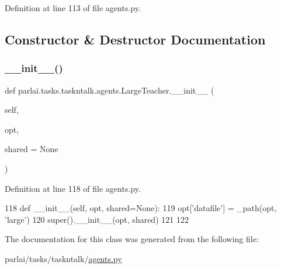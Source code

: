 Definition at line 113 of file agents.\+py.



\subsection{Constructor \& Destructor Documentation}
\mbox{\label{classparlai_1_1tasks_1_1taskntalk_1_1agents_1_1LargeTeacher_af178f2514d254ac1ae9b0d956041d13c}} 
\subsubsection{\texorpdfstring{\+\_\+\+\_\+init\+\_\+\+\_\+()}{\_\_init\_\_()}}
{\footnotesize\ttfamily def parlai.\+tasks.\+taskntalk.\+agents.\+Large\+Teacher.\+\_\+\+\_\+init\+\_\+\+\_\+ (\begin{DoxyParamCaption}\item[{}]{self,  }\item[{}]{opt,  }\item[{}]{shared = {\ttfamily None} }\end{DoxyParamCaption})}



Definition at line 118 of file agents.\+py.


\begin{DoxyCode}
118     \textcolor{keyword}{def }\_\_init\_\_(self, opt, shared=None):
119         opt[\textcolor{stringliteral}{'datafile'}] = \_path(opt, \textcolor{stringliteral}{'large'})
120         super().\_\_init\_\_(opt, shared)
121 
122 
\end{DoxyCode}


The documentation for this class was generated from the following file\+:\begin{DoxyCompactItemize}
\item 
parlai/tasks/taskntalk/\hyperlink{parlai_2tasks_2taskntalk_2agents_8py}{agents.\+py}\end{DoxyCompactItemize}
